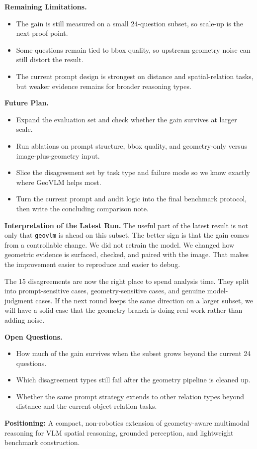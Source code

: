\documentclass[10pt]{article}
\newcommand{\track}[1]{\texttt{#1}}
\begin{document}
\textbf{Remaining Limitations.}
\begin{itemize}
  \item The gain is still measured on a small 24-question subset, so scale-up is the next proof point.
  \item Some questions remain tied to bbox quality, so upstream geometry noise can still distort the result.
  \item The current prompt design is strongest on distance and spatial-relation tasks, but weaker evidence remains for broader reasoning types.
\end{itemize}

\textbf{Future Plan.}
\begin{itemize}
  \item Expand the evaluation set and check whether the gain survives at larger scale.
  \item Run ablations on prompt structure, bbox quality, and geometry-only versus image-plus-geometry input.
  \item Slice the disagreement set by task type and failure mode so we know exactly where GeoVLM helps most.
  \item Turn the current prompt and audit logic into the final benchmark protocol, then write the concluding comparison note.
\end{itemize}

\textbf{Interpretation of the Latest Run.}
The useful part of the latest result is not only that \track{geovlm} is ahead on this subset. The better sign is that the gain comes from a controllable change. We did not retrain the model. We changed how geometric evidence is surfaced, checked, and paired with the image. That makes the improvement easier to reproduce and easier to debug.

The 15 disagreements are now the right place to spend analysis time. They split into prompt-sensitive cases, geometry-sensitive cases, and genuine model-judgment cases. If the next round keeps the same direction on a larger subset, we will have a solid case that the geometry branch is doing real work rather than adding noise.

\textbf{Open Questions.}
\begin{itemize}
  \item How much of the gain survives when the subset grows beyond the current 24 questions.
  \item Which disagreement types still fail after the geometry pipeline is cleaned up.
  \item Whether the same prompt strategy extends to other relation types beyond distance and the current object-relation tasks.
\end{itemize}

{\footnotesize \textbf{Positioning:} A compact, non-robotics extension of geometry-aware multimodal reasoning for VLM spatial reasoning, grounded perception, and lightweight benchmark construction.}
\end{document}
